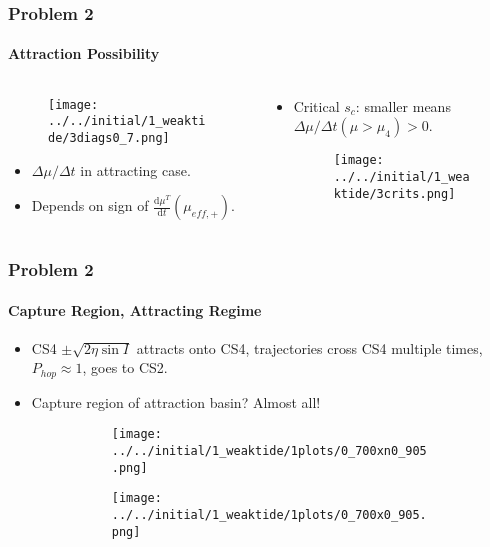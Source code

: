 \documentclass[dvipsnames, 11pt]{beamer}
\newcommand*{\rd}[2]{\frac{\mathrm{d}#1}{\mathrm{d}#2}}
\begin{document}
\begin{frame}
    \frametitle{Problem 2}
    \framesubtitle{Attraction Possibility}

    \begin{columns}
        \begin{column}{0.5\textwidth}
            \begin{figure}[t]
                \centering
                \texttt{[image: ../../initial/1\_weaktide/3diags0\_7.png]}
            \end{figure}

            \begin{itemize}
                \item $\Delta \mu/\Delta t$ in attracting case.
                \item Depends on sign of $\rd{\mu^{T}}{t}(\mu_{eff, +})$.
            \end{itemize}
        \end{column}
        \begin{column}{0.5\textwidth}
            \begin{itemize}
                \item Critical $s_c$: smaller means $\Delta \mu/\Delta t(\mu >
                    \mu_4) > 0$.

                \begin{figure}[t]
                    \centering
                    \texttt{[image: ../../initial/1\_weaktide/3crits.png]}
                \end{figure}
            \end{itemize}
        \end{column}
    \end{columns}
\end{frame}

\begin{frame}
    \frametitle{Problem 2}
    \framesubtitle{Capture Region, Attracting Regime}

    \begin{itemize}
        \item CS4 $\pm \sqrt{2\eta \sin I}$ attracts onto CS4, trajectories
            cross CS4 multiple times, $P_{hop} \approx 1$, goes to CS2.

        \item Capture region of attraction basin? Almost all!

        \begin{figure}[t]
            \centering
            \begin{subfigure}{0.45\textwidth}
                \centering
                \texttt{[image: ../../initial/1\_weaktide/1plots/0\_700xn0\_905.png]}
            \end{subfigure}
            \begin{subfigure}{0.45\textwidth}
                \centering
                \texttt{[image: ../../initial/1\_weaktide/1plots/0\_700x0\_905.png]}
            \end{subfigure}
        \end{figure}
    \end{itemize}
\end{frame}
\end{document}
